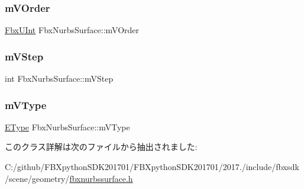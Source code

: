 \mbox{\label{class_fbx_nurbs_surface_ada5ba08a59866a76ccbfc80703393d3d}} 
\subsubsection{\texorpdfstring{m\+V\+Order}{mVOrder}}
{\footnotesize\ttfamily \hyperlink{fbxtypes_8h_ae9fb141d8158a730aa85ec5ff2ea3f6b}{Fbx\+U\+Int} Fbx\+Nurbs\+Surface\+::m\+V\+Order\hspace{0.3cm}{\ttfamily [protected]}}

\mbox{\label{class_fbx_nurbs_surface_a3b9b47f98eb0a4177366c172e32adea5}} 
\subsubsection{\texorpdfstring{m\+V\+Step}{mVStep}}
{\footnotesize\ttfamily int Fbx\+Nurbs\+Surface\+::m\+V\+Step\hspace{0.3cm}{\ttfamily [protected]}}

\mbox{\label{class_fbx_nurbs_surface_a2c836673f55f882dcdc6a86dbac716c0}} 
\subsubsection{\texorpdfstring{m\+V\+Type}{mVType}}
{\footnotesize\ttfamily \hyperlink{class_fbx_nurbs_surface_a87c1fcd98d8fa511ee6c6166346a46b3}{E\+Type} Fbx\+Nurbs\+Surface\+::m\+V\+Type\hspace{0.3cm}{\ttfamily [protected]}}



このクラス詳解は次のファイルから抽出されました\+:\begin{DoxyCompactItemize}
\item 
C\+:/github/\+F\+B\+Xpython\+S\+D\+K201701/\+F\+B\+Xpython\+S\+D\+K201701/2017./include/fbxsdk/scene/geometry/\hyperlink{fbxnurbssurface_8h}{fbxnurbssurface.\+h}\end{DoxyCompactItemize}
